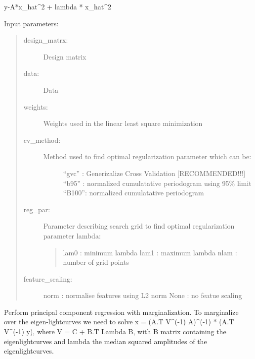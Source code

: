 \documentclass[a4paper,11pt,english]{sphinxmanual}
\begin{document}
\begin{fulllineitems}
\begin{description}
\textbar{}\textbar{}y-A*x\_hat\textbar{}\textbar{}\textasciicircum{}2 + lambda * \textbar{}\textbar{}x\_hat\textbar{}\textbar{}\textasciicircum{}2

Input parameters:
\begin{quote}
\begin{description}
\item[{design\_matrx:}] \leavevmode
Design matrix

\item[{data:}] \leavevmode
Data

\item[{weights:}] \leavevmode
Weights used in the linear least square minimization

\item[{cv\_method:}] \leavevmode\begin{description}
\item[{Method used to find optimal regularization parameter which can be:}] \leavevmode
“gvc” :  Generizalize Cross Validation {[}RECOMMENDED!!!{]}
“b95” :  normalized cumulatative periodogram using 95\% limit
“B100”:  normalized cumulatative periodogram

\end{description}

\item[{reg\_par:}] \leavevmode
Parameter describing search grid to find optimal regularization
parameter lambda:
\begin{quote}

lam0 : minimum lambda
lam1 : maximum lambda
nlam : number of grid points
\end{quote}

\item[{feature\_scaling:}] \leavevmode
norm : normalise features using L2 norm
None : no featue scaling

\end{description}
\end{quote}

\end{description}

\end{fulllineitems}


\begin{fulllineitems}
\label{\detokenize{cascade.cpm_model:cascade.cpm_model.cpm_model.return_PCR}}
Perform principal component regression with marginalization.
To marginalize over the eigen-lightcurves we need to solve
x = (A.T V\textasciicircum{}(-1) A)\textasciicircum{}(-1) * (A.T V\textasciicircum{}(-1) y), where V = C + B.T Lambda B,
with B matrix containing the eigenlightcurves and lambda
the median squared amplitudes of the eigenlightcurves.

\end{fulllineitems}
\end{document}
